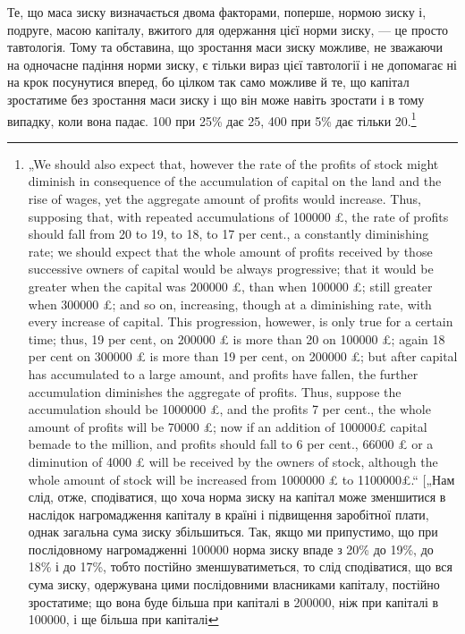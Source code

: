 Те, що маса зиску визначається двома факторами, поперше,
нормою зиску і, подруге, масою капіталу, вжитого для одержання
цієї норми зиску, — це просто тавтологія. Тому та обставина,
що зростання маси зиску можливе, не зважаючи на одночасне
падіння норми зиску, є тільки вираз цієї тавтології і
не допомагає ні на крок посунутися вперед, бо цілком так само
можливе й те, що капітал зростатиме без зростання маси зиску
і що він може навіть зростати і в тому випадку, коли вона
падає. 100 при 25\% дає 25, 400 при 5\% дає тільки 20.\footnote{
„We should also expect that, however the rate of the profits of stock
might diminish in consequence of the accumulation of capital on the land and the
rise of wages, yet the aggregate amount of profits would increase. Thus, supposing
that, with repeated accumulations of \num{100000} £, the rate of profits should fall from
20 to 19, to 18, to 17 per cent., a constantly diminishing rate; we should expect that
the whole amount of profits received by those successive owners of capital would be
always progressive; that it would be greater when the capital was \num{200000} £, than
when \num{100000} £; still greater when \num{300000}  £; and so on, increasing, though at a
diminishing rate, with every increase of capital. This progression, howewer, is only
true for a certain time; thus, 19 per cent, on \num{200000} £ is more than 20 on \num{100000} £;
again 18 per cent on \num{300000} £ is more than 19 per cent, on \num{200000} £; but after
capital has accumulated to a large amount, and profits have fallen, the further
accumulation diminishes the aggregate of profits. Thus, suppose the accumulation
should be \num{1000000} £, and the profits 7 per cent., the whole amount of profits will be
\num{70000} £; now if an addition of \num{100000}£ capital bemade to the million, and profits should
fall to 6 per cent., \num{66000} £ or a diminution of 4000 £ will be received by the owners
of stock, although the whole amount of stock will be increased from \num{1000000} £ to
\num{1100000}£.“ [„Нам слід, отже, сподіватися, що хоча норма зиску на капітал може
зменшитися в наслідок нагромадження капіталу в країні і підвищення заробітної
плати, однак загальна сума зиску збільшиться. Так, якщо ми припустимо, що при
послідовному нагромадженні \num{100000} норма зиску впаде з 20\% до
19\%, до 18\% і до 17\%, тобто постійно зменшуватиметься, то слід сподіватися,
що вся сума зиску, одержувана цими послідовними власниками капіталу, постійно
зростатиме; що вона буде більша при капіталі в \num{200000},
ніж при капіталі в \num{100000}, і ще більша при капіталі
}
